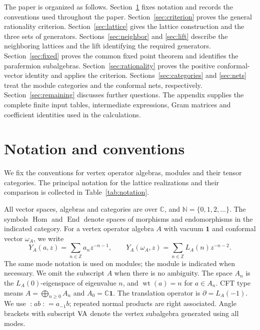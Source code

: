 \documentclass[11pt,reqno]{amsart}
\theoremstyle{definition}\newtheorem{definition}[theorem]{Definition}
\theoremstyle{remark}\newtheorem{remark}[theorem]{Remark}
\newcommand{\C}{\mathbb C}\newcommand{\Z}{\mathbb Z}\newcommand{\Q}{\mathbb Q}
\newcommand{\one}{\mathbf1}\newcommand{\slc}{\mathfrak{sl}_2}
\newcommand{\wt}{\operatorname{wt}}\newcommand{\eps}{\epsilon}
\newcommand{\nn}[1]{\mathopen{:}#1\mathclose{:}}
\numberwithin{equation}{section}
\begin{document}
The paper is organized as follows. Section~\ref{sec:notation} fixes notation and records the conventions used throughout the paper. Section~\ref{sec:criterion} proves the general rationality criterion. Section~\ref{sec:lattice} gives the lattice construction and the three sets of generators. Sections~\ref{sec:neighbor} and \ref{sec:lift} describe the neighboring lattices and the lift identifying the required generators. Section~\ref{sec:fixed} proves the common fixed point theorem and identifies the parafermion subalgebras. Section~\ref{sec:rationality} proves the positive conformal-vector identity and applies the criterion. Sections~\ref{sec:categories} and \ref{sec:nets} treat the module categories and the conformal nets, respectively. Section~\ref{sec:remaining} discusses further questions. The appendix supplies the complete finite input tables, intermediate expressions, Gram matrices and coefficient identities used in the calculations.


\section{Notation and conventions}\label{sec:notation}
We fix the conventions for vertex operator algebras, modules and their tensor categories. The principal notation for the lattice realizations and their comparison is collected in Table~\ref{tab:notation}.

All vector spaces, algebras and categories are over $\C$, and $\mathbb N=\{0,1,2,\ldots\}$. The symbols $\operatorname{Hom}$ and $\operatorname{End}$ denote spaces of morphisms and endomorphisms in the indicated category. For a vertex operator algebra $A$ with vacuum $\one$ and conformal vector $\omega_A$, we write
\[
 Y_A(a,z)=\sum_{n\in\Z}a_nz^{-n-1},\qquad
 Y_A(\omega_A,z)=\sum_{n\in\Z}L_A(n)z^{-n-2}.
\]
The same mode notation is used on modules; the module is indicated when necessary. We omit the subscript $A$ when there is no ambiguity. The space $A_n$ is the $L_A(0)$-eigenspace of eigenvalue $n$, and $\wt(a)=n$ for $a\in A_n$. CFT type means $A=\bigoplus_{n\ge0}A_n$ and $A_0=\C\one$. The translation operator is $\partial=L_A(-1)$. We use $\nn{ab}=a_{-1}b$; repeated normal products are right associated. Angle brackets with subscript ${\rm VA}$ denote the vertex subalgebra generated using all modes.
\end{document}
